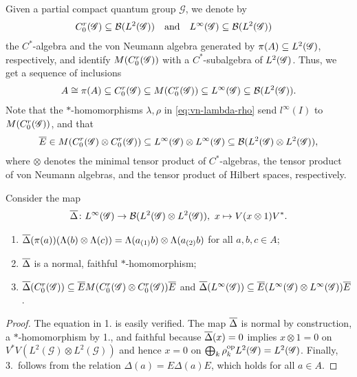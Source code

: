 Given a partial compact quantum group $\mathscr{G}$, we denote by
\begin{align}
  C^{r}_{0}(\mathscr{G}) &\subseteq {\cal B}(L^{2}(\mathscr{G})) &&\text{and} & L^{\infty}(\mathscr{G}) &\subseteq {\cal B}(L^{2}(\mathscr{G}))
\end{align}
the $C^{*}$-algebra and the von Neumann algebra generated by $\pi(A)
\subseteq L^{2}(\mathscr{G})$, respectively, and identify $M(C^{r}_{0}(\mathscr{G}))$ with a
$C^{*}$-subalgebra of $L^{2}(\mathscr{G})$.  Thus, we get a sequence of inclusions
\begin{align*}
A \cong \pi(A) \subseteq
  C^{r}_{0}(\mathscr{G}) \subseteq M(C^{r}_{0}(\mathscr{G})) \subseteq
L^{\infty}(\mathscr{G}) \subseteq {\cal B}(L^{2}(\mathscr{G})).
\end{align*}
Note that
 the $*$-homomorphisms $\lambda,\rho$ in
\eqref{eq:vn-lambda-rho} send $l^{\infty}(I)$ to $M(C^{r}_{0}(\mathscr{G}))$, and that
\begin{align*}
  \overline{E} \in M(C^{r}_{0}(\mathscr{G}) \otimes C^{r}_{0}(\mathscr{G})) \subseteq L^{\infty}(\mathscr{G}) \otimes L^{\infty}(\mathscr{G})
  \subseteq {\cal B}(L^{2}(\mathscr{G}) \otimes L^{2}(\mathscr{G})),
\end{align*}
where $\otimes$ denotes the minimal tensor product
of $C^{*}$-algebras, the tensor product of von Neumann algebras, and
the tensor product of Hilbert spaces, respectively.

Consider the map 
\begin{align*}
  \overline{\Delta} \colon L^{\infty}(\mathscr{G}) \to {\cal B}(L^{2}(\mathscr{G}) \otimes L^{2}(\mathscr{G})), \ x
  \mapsto V(x \otimes 1)V^{*}.
\end{align*}
\begin{Lem} \label{lemma:vn-delta}
  \begin{enumerate}
  \item $\overline{\Delta}(\pi(a)) (\Lambda(b) \otimes \Lambda(c)) =
    \Lambda(a_{(1)}b) \otimes \Lambda(a_{(2)}b)$ for all $a,b,c\in A$;
  \item $\overline{\Delta}$ is a normal, faithful $*$-homomorphism;
  \item  $\overline{\Delta}(C^{r}_{0}(\mathscr{G})) \subseteq \overline{E} M(C^{r}_{0}(\mathscr{G}) \otimes
  C^{r}_{0}(\mathscr{G}))\overline{E}$ and $\overline{\Delta}(L^{\infty}(\mathscr{G})) \subseteq \overline{E}(L^{\infty}(\mathscr{G}) \otimes
  L^{\infty}(\mathscr{G}))\overline{E}$.
  \end{enumerate}
\end{Lem}
\begin{proof}
  The equation in 1.{} is easily verified. The map $\overline{\Delta}$ is
  normal by construction, a $*$-homo\-morphism by 1.{}, and faithful
  because $\overline{\Delta}(x)=0$ implies $x\otimes 1=0$ on
  $V^{*}V(L^{2}(\mathscr{G}) \otimes L^{2}(\mathscr{G}))$ and hence
  $x=0$ on $\bigoplus_{k}
  \rho_{k}^{\operatorname{\mathrm{op}}}L^{2}(\mathscr{G})=L^{2}(\mathscr{G})$. Finally, 3.\
  follows from the relation $\Delta(a)=E\Delta(a)E$, which holds for
  all $a\in A$.
\end{proof}


